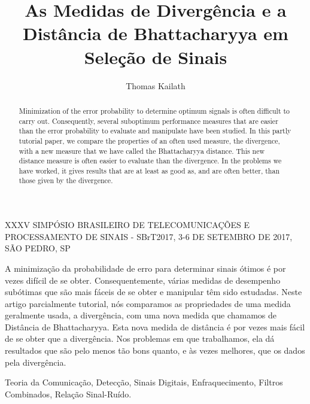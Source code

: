 \documentclass{sbrt2017port}
\begin{document}
\title{As Medidas de Divergência e a Distância de Bhattacharyya em Seleção de Sinais}

\author{Thomas Kailath}

\maketitle

 {XXXV SIMPÓSIO BRASILEIRO DE TELECOMUNICAÇÕES E PROCESSAMENTO DE SINAIS - SBrT2017, 3-6 DE SETEMBRO DE 2017, SÃO PEDRO, SP}

\begin{resumo}
A minimização da probabilidade de erro para determinar sinais ótimos é por vezes difícil de se obter. Consequentemente, várias medidas de desempenho subótimas que são mais fáceis de se obter e manipular têm sido estudadas. Neste artigo parcialmente tutorial, nós comparamos as propriedades de uma medida geralmente usada, a divergência, com uma nova medida que chamamos de Distância de Bhattacharyya. Esta nova medida de distância é por vezes mais fácil de se obter que a divergência. Nos problemas em que trabalhamos, ela dá resultados que são pelo menos tão bons quanto, e às vezes melhores, que os dados pela divergência.
\end{resumo}

\begin{chave}
Teoria da Comunicação, Detecção, Sinais Digitais, Enfraquecimento, Filtros Combinados, Relação Sinal-Ruído.
\end{chave}

\begin{abstract}
Minimization of the error probability to determine optimum signals is often difficult to carry out. Consequently, several suboptimum performance measures that are easier than the error probability to evaluate and manipulate have been studied. In this partly tutorial paper, we compare the properties of an often used measure, the divergence, with a new measure that we have called the Bhattacharyya distance. This new distance measure is often easier to evaluate than the divergence. In the problems we have worked, it gives results that are at least as good as, and are often better, than those given by the divergence.
\end{abstract}
\end{document}
